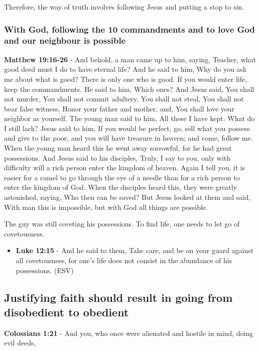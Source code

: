 \documentclass[11pt]{article}
\begin{document}
Therefore, the way of truth involves following Jesus and putting a stop to sin.

\subsubsection{With God, following the 10 commandments and to love God and our neighbour is possible}
\label{sec:org7f1e250}

\textbf{Matthew 19:16-26} - And behold, a man came up to him, saying, Teacher, what good deed must I do to have eternal life? And he said to him, Why do you ask me about what is good? There is only one who is good. If you would enter life, keep the commandments. He said to him, Which ones? And Jesus said, You shall not murder, You shall not commit adultery, You shall not steal, You shall not bear false witness, Honor your father and mother, and, You shall love your neighbor as yourself. The young man said to him, All these I have kept. What do I still lack? Jesus said to him, If you would be perfect, go, sell what you possess and give to the poor, and you will have treasure in heaven; and come, follow me. When the young man heard this he went away sorrowful, for he had great possessions. And Jesus said to his disciples, Truly, I say to you, only with difficulty will a rich person enter the kingdom of heaven. Again I tell you, it is easier for a camel to go through the eye of a needle than for a rich person to enter the kingdom of God. When the disciples heard this, they were greatly astonished, saying, Who then can be saved? But Jesus looked at them and said, With man this is impossible, but with God all things are possible.

The guy was still coveting his possessions. To find life, one needs to let go of covetousness.

\begin{itemize}
\item \textbf{Luke 12:15} - And he said to them, Take care, and be on your guard against all covetousness, for one's life does not consist in the abundance of his possessions. (ESV)
\end{itemize}

\subsection{Justifying faith should result in going from disobedient to obedient}
\label{sec:org3cdc7c4}
\textbf{Colossians 1:21} - And you, who once were alienated and hostile in mind, doing evil deeds,
\end{document}
